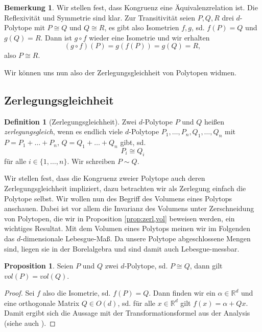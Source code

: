 \documentclass[11pt,titlepage]{article}
\newcommand{\setR}{\mathbb{R}}
\theoremstyle{definition}
\newtheorem{proposition}[theorem]{Proposition}
\newtheorem{definition}[theorem]{Definition}
\newtheorem{remark}[theorem]{Bemerkung}
\theoremstyle{remark}
\begin{document}
	\begin{remark}
		Wir stellen fest, dass Kongruenz eine Äquivalenzrelation ist. 
		Die Reflexivität und Symmetrie sind klar. Zur Transitivität seien 
		$P,Q,R$ drei $d$-Polytope mit $P\cong Q$ und $Q\cong R$, es gibt also 
		Isometrien $f,g$, sd. $f(P)=Q$ und $g(Q)=R$. Dann ist $g\circ f$ 
		wieder eine Isometrie und wir erhalten 
		\[(g\circ f)(P)=g(f(P))=g(Q)=R,\]
		also $P\cong R$. 
	\end{remark}
	
	Wir können uns nun also der Zerlegungsgleichheit von Polytopen widmen.
	
	\subsection{Zerlegungsgleichheit}
	
	\begin{definition}[Zerlegungsgleichheit]
		Zwei $d$-Polytope $P$ und $Q$ heißen \textsl{zerlegungsgleich}, wenn es endlich viele $d$-Polytope 
		$P_1,\ldots,P_n,Q_1,\ldots,Q_n$ mit $P=P_1 +\ldots +P_n$,  $Q=Q_1 +\ldots+Q_n$ 
		gibt, sd. 
		\[P_i\cong Q_i\]
		für alle $i\in\{1,\ldots,n\}$. Wir schreiben $P\sim Q$.
	\end{definition}
	
	Wir stellen fest, dass die Kongruenz zweier Polytope auch deren 
	Zerlegungsgleichheit impliziert, dazu betrachten wir als Zerlegung einfach 
	die Polytope selbst. Wir wollen nun des Begriff des Volumens eines Polytops anschauen. Dabei ist 
	vor allem die Invarianz des Volumens unter Zerschneidung von Polytopen, die wir in Proposition \ref{prop:zerl,vol} beweisen werden, ein wichtiges Resultat. Mit dem Volumen eines Polytops meinen wir im Folgenden das 
	$d$-dimensionale Lebesgue-Maß. Da unsere Polytope abgeschlossene Mengen 
	sind, liegen sie in der Borelalgebra und sind damit auch Lebesgue-messbar.
	
	\begin{proposition} \label{prop:cong,vol}
		Seien $P$ und $Q$ zwei $d$-Polytope, sd. $P\cong Q$, dann gilt $vol(P)=vol(Q)$.
	\end{proposition}
	
	\begin{proof}
		Sei $f$ also die Isometrie, sd. $f(P)=Q$. Dann finden wir ein 
		$\alpha\in\setR^d$ und eine orthogonale Matrix $Q\in O(d)$, sd. für 
		alle $x\in\setR^d$ gilt $f(x)=\alpha+Qx$. Damit ergibt sich die Aussage 
		mit der Transformationsformel 
		aus der Analysis (siehe auch \cite[Satz 4.7]{SkriptAna3}).
	\end{proof}
	
\end{document}
